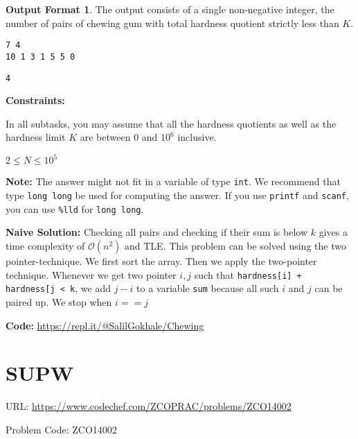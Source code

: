\documentclass[twoside,12pt,a4paper,english]{book}
\theoremstyle{definition}
\theoremstyle{problemstyle}
\theoremstyle{problemstyle}
\theoremstyle{problemstyle}
\newtheorem*{output_st}{Output Format} %
\begin{document}
\begin{output_st}

The output consists of a single non-negative integer, the number of pairs of chewing gum with total hardness quotient strictly less than $K$.

\end{output_st}

\begin{tcolorbox}[title=Example]
\begin{lstlisting}
7 4
10 1 3 1 5 5 0
\end{lstlisting}
\tcblower
\begin{lstlisting}
4
\end{lstlisting}
\end{tcolorbox}

\textbf{Constraints:}

    In all subtasks, you may assume that all the hardness quotients as well as the hardness limit $K$ are between 0 and $10^6$ inclusive.
    
    $2 \leq N \leq 10^5$

\textbf{Note:} The answer might not fit in a variable of type \texttt{int}. We recommend that type \texttt{long long} be used for computing the answer. If you use \texttt{printf} and \texttt{scanf}, you can use \texttt{\%lld} for \texttt{long long}.

\begin{tcolorbox}[title=Solution]
\textbf{Naive Solution:} Checking all pairs and checking if their sum is below $k$ gives a time complexity of $\mathcal{O}(n^2)$ and TLE.
\tcblower
This problem can be solved using the two pointer-technique. We first sort the array. Then we apply the two-pointer technique. Whenever we get two pointer $i, j$ such that \texttt{hardness[i] + hardness[j < k}, we add $j-i$ to a variable \texttt{sum} because all such $i$ and $j$ can be paired up. We stop when $i==j$

\textbf{Code: } \url{https://repl.it/@SalilGokhale/Chewing}

\end{tcolorbox}

\newpage

\section{SUPW}

URL: \url{https://www.codechef.com/ZCOPRAC/problems/ZCO14002}

Problem Code: ZCO14002
\end{document}
